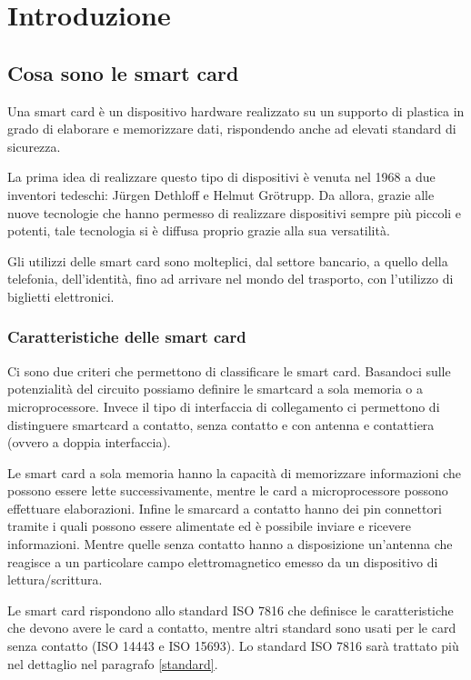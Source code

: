 \chapter{Introduzione}
\label{chapter1}

\section{Cosa sono le smart card}
\label{intro}
Una smart card è un dispositivo hardware realizzato su un supporto di plastica in grado di elaborare e memorizzare dati, rispondendo anche ad elevati standard di sicurezza.

La prima idea di realizzare questo tipo di dispositivi è venuta nel 1968 a due inventori tedeschi: Jürgen Dethloff e Helmut Grötrupp. Da allora, grazie alle nuove tecnologie che hanno permesso di realizzare dispositivi sempre più piccoli e potenti, tale tecnologia si è diffusa proprio grazie alla sua versatilità.

Gli utilizzi delle smart card sono molteplici, dal settore bancario, a quello della telefonia, dell'identità, fino ad arrivare nel mondo del trasporto, con l'utilizzo di biglietti elettronici.
\cite{wiki_sc}

\subsection{Caratteristiche  delle smart card}

Ci sono due criteri che permettono di classificare le smart card. Basandoci sulle potenzialità del circuito possiamo definire le smartcard a sola memoria o a microprocessore. Invece il tipo di interfaccia di collegamento ci permettono di distinguere smartcard a contatto, senza contatto e con antenna e contattiera (ovvero a doppia interfaccia).

Le smart card a sola memoria hanno la capacità di memorizzare informazioni che possono essere lette successivamente, mentre le card a microprocessore possono effettuare elaborazioni. Infine le smarcard a contatto hanno dei pin connettori tramite i quali possono essere alimentate ed è possibile inviare e ricevere informazioni. Mentre quelle senza contatto hanno a disposizione un'antenna che reagisce a un particolare campo elettromagnetico emesso da un dispositivo di lettura/scrittura.

Le smart card rispondono allo standard ISO 7816 che definisce le caratteristiche che devono avere le card a contatto, mentre altri standard sono usati per le card senza contatto (ISO 14443 e ISO 15693). Lo standard ISO 7816 sarà trattato più nel dettaglio nel paragrafo \ref{standard}.

